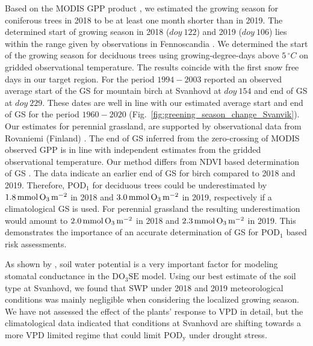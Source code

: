 \documentclass[bg, manuscript]{copernicus}
\begin{document}
Based on the MODIS GPP product \citep{MODIS_PSN}, we estimated the growing season for coniferous trees in 2018 to be at least one month shorter than in 2019. The determined start of growing season in 2018 ($\unit{doy}~122$) and 2019 ($\unit{doy}~106$) lies within the range given by observations in Fennoscandia \citep{TB:Kolari2007,IVL:Karlsson2018}. We determined the start of the growing season for deciduous trees using growing-degree-days above $5\,\unit{^\circ C}$ on gridded observational temperature. The results coincide with the first snow free days in our target region.
For the period $1994-2003$ \citet{IJB:Shutova2006} reported an observed average start of the GS for mountain birch at Svanhovd at $\unit{doy}~154$ and end of GS at $\unit{doy}~ 229$. These dates are well in line with our estimated average start and end of GS for the period $1960-2020$ (Fig.~\ref{fig:greening_season_change_Svanvik}).
Our estimates for perennial grassland, are supported by observational data from Rovaniemi (Finland) \citep{FCR:Korhonen2018}. The end of GS inferred from the zero-crossing of MODIS observed GPP is in line with independent estimates from the gridded observational temperature. Our method differs from NDVI based determination of GS \citep{IGARSS:Hogda2001,IJB:Karlsen2007, RS:Hogda2013}.
The \citet{IJB:Shutova2006} data indicate an earlier end of GS for birch compared to 2018 and 2019. Therefore, $\mathrm{POD_1}$ for deciduous trees could be underestimated by $1.8\,\unit{mmol\,\chem{O_3}\,m^{-2}}$ in 2018 and $3.0\,\unit{mmol\,\chem{O_3}\,m^{-2}}$ in 2019, respectively if a climatological GS is used. For perennial grassland the resulting underestimation would amount to $2.0\,\unit{mmol\,\chem{O_3}\,m^{-2}}$ in 2018 and $2.3\,\unit{mmol\,\chem{O_3}\,m^{-2}}$ in 2019. This demonstrates the importance of an accurate determination of GS for $\mathrm{POD_1}$ based risk assessments.

As shown by \citet{ACP:Bueker2012}, soil water potential is a very important factor for modeling stomatal conductance in the $\mathrm{DO_3SE}$ model. Using our best estimate of the soil type at Svanhovd, we found that SWP under 2018 and 2019 meteorological conditions was mainly negligible when considering the localized growing season. We have not assessed the effect of the plants' response to VPD in detail, but the climatological data indicated that conditions at Svanhovd are shifting towards a more VPD limited regime that could limit $\mathrm{POD_y}$ under drought stress. 
\end{document}
